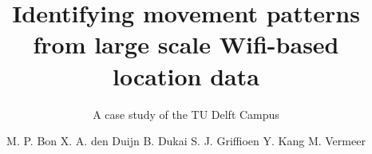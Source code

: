 \documentclass{tudelft-report}
\begin{document}
\frontmatter
\title[tudelft-black]{\fontsize{30}{5}\selectfont Identifying movement patterns from large scale Wifi-based location data}
\subtitle[tudelft-black]{\fontsize{20}{1.2}\selectfont\hspace{4cm}A case study of the TU Delft Campus}
\author[tudelft-black]{\fontsize{15}{10}\selectfont M. P. Bon
\vskip 0.15cm X. A. den Duijn
\vskip 0.15cm B. Dukai
\vskip 0.15cm S. J. Griffioen
\vskip 0.15cm Y. Kang
\vskip 0.15cm M. Vermeer}
\makecover[split]

	



\tableofcontents

\mainmatter
%













%

















%
\nocite{*}
\printbibliography
\end{document}
